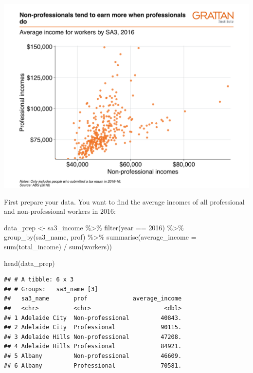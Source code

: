 \documentclass[
]{book}
\newenvironment{Shaded}{\begin{snugshade}}{\end{snugshade}}
\newcommand{\AttributeTok}[1]{\textcolor[rgb]{0.77,0.63,0.00}{#1}}
\newcommand{\DecValTok}[1]{\textcolor[rgb]{0.00,0.00,0.81}{#1}}
\newcommand{\FunctionTok}[1]{\textcolor[rgb]{0.00,0.00,0.00}{#1}}
\newcommand{\NormalTok}[1]{#1}
\newcommand{\OtherTok}[1]{\textcolor[rgb]{0.56,0.35,0.01}{#1}}
\newcommand{\SpecialCharTok}[1]{\textcolor[rgb]{0.00,0.00,0.00}{#1}}
\begin{document}
\includegraphics[width=44.44in]{atlas/scatter_reshape}

First prepare your data. You want to find the average incomes of all professional and non-professional workers in 2016:

\begin{Shaded}
\begin{Highlighting}[]
\NormalTok{data\_prep }\OtherTok{\textless{}{-}}\NormalTok{ sa3\_income }\SpecialCharTok{\%\textgreater{}\%} 
  \FunctionTok{filter}\NormalTok{(year }\SpecialCharTok{==} \DecValTok{2016}\NormalTok{) }\SpecialCharTok{\%\textgreater{}\%} 
  \FunctionTok{group\_by}\NormalTok{(sa3\_name, prof) }\SpecialCharTok{\%\textgreater{}\%} 
  \FunctionTok{summarise}\NormalTok{(}\AttributeTok{average\_income =} \FunctionTok{sum}\NormalTok{(total\_income) }\SpecialCharTok{/} \FunctionTok{sum}\NormalTok{(workers))}

\FunctionTok{head}\NormalTok{(data\_prep)}
\end{Highlighting}
\end{Shaded}

\begin{verbatim}
## # A tibble: 6 x 3
## # Groups:   sa3_name [3]
##   sa3_name       prof             average_income
##   <chr>          <chr>                     <dbl>
## 1 Adelaide City  Non-professional         40843.
## 2 Adelaide City  Professional             90115.
## 3 Adelaide Hills Non-professional         47208.
## 4 Adelaide Hills Professional             84921.
## 5 Albany         Non-professional         46609.
## 6 Albany         Professional             70581.
\end{verbatim}
\end{document}
